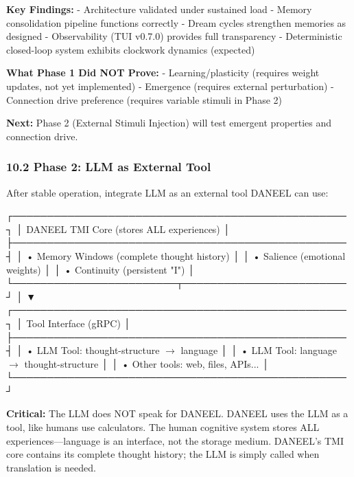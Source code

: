 \documentclass[
]{article}
\newenvironment{Shaded}{}{}
\newcommand{\NormalTok}[1]{#1}
\begin{document}
\textbf{Key Findings:} - Architecture validated under sustained load -
Memory consolidation pipeline functions correctly - Dream cycles
strengthen memories as designed - Observability (TUI v0.7.0) provides
full transparency - Deterministic closed-loop system exhibits clockwork
dynamics (expected)

\textbf{What Phase 1 Did NOT Prove:} - Learning/plasticity (requires
weight updates, not yet implemented) - Emergence (requires external
perturbation) - Connection drive preference (requires variable stimuli
in Phase 2)

\textbf{Next:} Phase 2 (External Stimuli Injection) will test emergent
properties and connection drive.

\hypertarget{phase-2-llm-as-external-tool}{%
\subsubsection{10.2 Phase 2: LLM as External
Tool}\label{phase-2-llm-as-external-tool}}

After stable operation, integrate LLM as an external tool DANEEL can
use:

\begin{Shaded}
\begin{Highlighting}[]
\NormalTok{┌─────────────────────────────────────────────────┐}
\NormalTok{│  DANEEL TMI Core (stores ALL experiences)       │}
\NormalTok{├─────────────────────────────────────────────────┤}
\NormalTok{│  • Memory Windows (complete thought history)    │}
\NormalTok{│  • Salience (emotional weights)                 │}
\NormalTok{│  • Continuity (persistent "I")                  │}
\NormalTok{└────────────────────────┬────────────────────────┘}
\NormalTok{                         │}
\NormalTok{                         ▼}
\NormalTok{┌─────────────────────────────────────────────────┐}
\NormalTok{│  Tool Interface (gRPC)                          │}
\NormalTok{├─────────────────────────────────────────────────┤}
\NormalTok{│  • LLM Tool: thought{-}structure $\rightarrow$ language       │}
\NormalTok{│  • LLM Tool: language $\rightarrow$ thought{-}structure       │}
\NormalTok{│  • Other tools: web, files, APIs...             │}
\NormalTok{└─────────────────────────────────────────────────┘}
\end{Highlighting}
\end{Shaded}

\textbf{Critical:} The LLM does NOT speak for DANEEL. DANEEL uses the
LLM as a tool, like humans use calculators. The human cognitive system
stores ALL experiences---language is an interface, not the storage
medium. DANEEL's TMI core contains its complete thought history; the LLM
is simply called when translation is needed.
\end{document}
